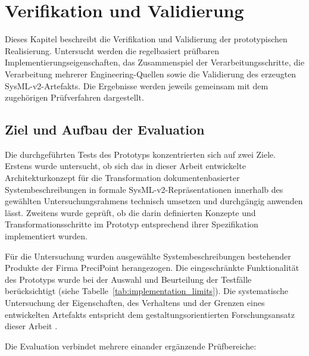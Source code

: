 \section{Verifikation und Validierung}
\label{sec:validation}

Dieses Kapitel beschreibt die Verifikation und Validierung der
prototypischen Realisierung. Untersucht werden die regelbasiert prüfbaren
Implementierungseigenschaften, das Zusammenspiel der Verarbeitungsschritte,
die Verarbeitung mehrerer Engineering-Quellen sowie die Validierung des
erzeugten SysML-v2-Artefakts. Die Ergebnisse werden jeweils gemeinsam mit
dem zugehörigen Prüfverfahren dargestellt.

\subsection{Ziel und Aufbau der Evaluation}
\label{sec:validation_objectives}

Die durchgeführten Tests des Prototyps konzentrierten sich auf zwei Ziele.
Erstens wurde untersucht, ob sich das in dieser Arbeit entwickelte
Architekturkonzept für die Transformation dokumentenbasierter
Systembeschreibungen in formale SysML-v2-Repräsentationen innerhalb des
gewählten Untersuchungsrahmens technisch umsetzen und durchgängig anwenden
lässt. Zweitens wurde geprüft, ob die darin definierten Konzepte und
Transformationsschritte im Prototyp entsprechend ihrer Spezifikation
implementiert wurden.

Für die Untersuchung wurden ausgewählte Systembeschreibungen bestehender
Produkte der Firma PreciPoint herangezogen. Die eingeschränkte Funktionalität
des Prototyps wurde bei der Auswahl und Beurteilung der Testfälle
berücksichtigt
(siehe Tabelle~\ref{tab:implementation_limits}). Die systematische
Untersuchung der Eigenschaften, des Verhaltens und der Grenzen eines
entwickelten Artefakts entspricht dem gestaltungsorientierten
Forschungsansatz dieser Arbeit
\cite{Wieringa2014,Peffers2007,ISO42030}.

Die Evaluation verbindet mehrere einander ergänzende Prüfbereiche:

